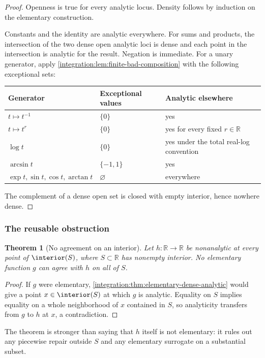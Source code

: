 \documentclass[11pt,oneside]{article}
\newtheorem{theorem}{Theorem}[section]
\theoremstyle{definition}
\theoremstyle{remark}
\newcommand{\R}{\mathbb R}
\begin{document}
\begin{proof}
Openness is true for every analytic locus.  Density follows by induction on the elementary
construction.

Constants and the identity are analytic everywhere.  For sums and products, the
intersection of the two dense open analytic loci is dense and each point in the intersection
is analytic for the result.  Negation is immediate.  For a unary generator, apply
\cref{integration:lem:finite-bad-composition} with the following exceptional sets:
\begin{center}
\begin{tabular}{@{}lll@{}}
\toprule
Generator & Exceptional values & Analytic elsewhere\\
\midrule
$t\mapsto t^{-1}$ & $\{0\}$ & yes\\
$t\mapsto t^r$ & $\{0\}$ & yes for every fixed $r\in\R$\\
$\log t$ & $\{0\}$ & yes under the total real-log convention\\
$\arcsin t$ & $\{-1,1\}$ & yes\\
$\exp t,\sin t,\cos t,\arctan t$ & $\varnothing$ & everywhere\\
\bottomrule
\end{tabular}
\end{center}
The complement of a dense open set is closed with empty interior, hence nowhere dense.
\end{proof}

\subsubsection{The reusable obstruction}

\begin{theorem}[No agreement on an interior]
\label{integration:thm:elementary-obstruction}
Let $h:\R\to\R$ be nonanalytic at every point of $\interior(S)$, where
$S\subset\R$ has nonempty interior.  No elementary function $g$ can agree with $h$ on all of
$S$.
\end{theorem}

\begin{proof}
If $g$ were elementary, \cref{integration:thm:elementary-dense-analytic} would give a point
$x\in\interior(S)$ at which $g$ is analytic.  Equality on $S$ implies equality on a whole
neighborhood of $x$ contained in $S$, so analyticity transfers from $g$ to $h$ at $x$, a
contradiction.
\end{proof}

The theorem is stronger than saying that $h$ itself is not elementary: it rules out any
piecewise repair outside $S$ and any elementary surrogate on a substantial subset.
\end{document}
